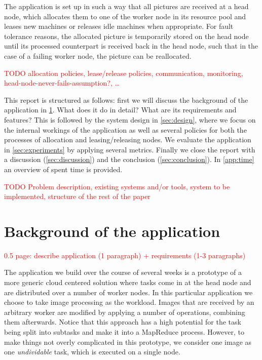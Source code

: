 \documentclass{stylesheet}
\begin{document}
The application is set up in such a way that all pictures are received at a head node, which allocates them to one of the worker node in its resource pool and leases new machines or releases idle machines when appropriate. For fault tolerance reasons, the allocated picture is temporarily stored on the head node until its processed counterpart is received back in the head node, such that in the case of a failing worker node, the picture can be reallocated.

\textcolor{red}{TODO allocation policies, lease/release policies, communication, monitoring, head-node-never-fails-assumption?, \ldots}

This report is structured as follows: first we will discuss the background of the application in \cref{sec:background}. What does it do in detail? What are its requirements and features? This is followed by the system design in \cref{sec:design}, where we focus on the internal workings of the application as well as several policies for both the processes of allocation and leasing/releasing nodes. We evaluate the application in \cref{sec:experiments} by applying several metrics. Finally we close the report with a discussion (\cref{sec:discussion}) and the conclusion (\cref{sec:conclusion}). In \cref{app:time} an overview of spent time is provided.

\textcolor{red}{TODO Problem description, existing systems and/or tools, system to be implemented, structure of the rest of the paper}

\section{Background of the application}
\label{sec:background}
\textcolor{red}{0.5 page: describe application (1 paragraph) + requirements (1-3 paragraphs)}

The application we build over the course of several weeks is a prototype of a more generic cloud centered solution where tasks come in at the head node and are distributed over a number of worker nodes. In this particular application we choose to take image processing as the workload. Images that are received by an arbitrary worker are modified by applying a number of operations, combining them afterwards. Notice that this approach has a high potential for the task being split into subtasks and make it into a MapReduce process. However, to make things not overly complicated in this prototype, we consider one image as one \textit{undividable} task, which is executed on a single node.
\end{document}
